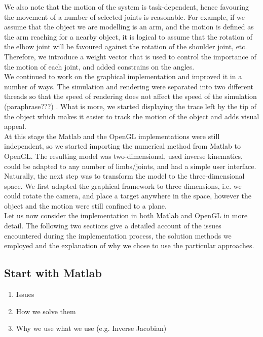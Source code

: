 \documentclass[paper=a4, fontsize=11pt]{scrartcl} %
\numberwithin{equation}{section} %
\numberwithin{figure}{section} %
\numberwithin{table}{section} %
\begin{document}
We also note that the motion of the system is task-dependent, hence favouring the movement of a number of selected joints is reasonable. For example, if we assume that the object we are modelling is an arm, and the motion is defined as the arm reaching for a nearby object, it is logical to assume that the rotation of the elbow joint will be favoured against the rotation of the shoulder joint, etc. Therefore, we introduce a weight vector that is used to control the importance of the motion of each joint, and added constrains on the angles.\\

We continued to work on the graphical implementation and improved it in a number of ways. The simulation and rendering were separated into two different threads so that the speed of rendering does not affect the speed of the simulation (paraphrase???) . What is more, we started displaying the trace left by the tip of the object which makes it easier to track the motion of the object and adds visual appeal. \\

At this stage the Matlab and the OpenGL implementations were still independent, so we started importing the numerical method from Matlab to OpenGL. The resulting model was two-dimensional, used inverse kinematics, could be adapted to any number of limbs/joints, and had a simple user interface. \\

Naturally, the next step was to transform the model to the three-dimensional space. We first adapted the graphical framework to three dimensions, i.e. we could rotate the camera, and place a target anywhere in the space, however the object and the motion were still confined to a plane. \\

Let us now consider the implementation in both Matlab and OpenGL in more detail. The following two sections give a detailed account of the issues encountered during the implementation process, the solution methods we employed and the explanation of why we chose to use the particular approaches. \\


\subsection{Start with Matlab}
    \begin{enumerate}
    \item Issues
    \item How we solve them
    \item Why we use what we use (e.g. Inverse Jacobian)
  \end{enumerate}
\end{document}
